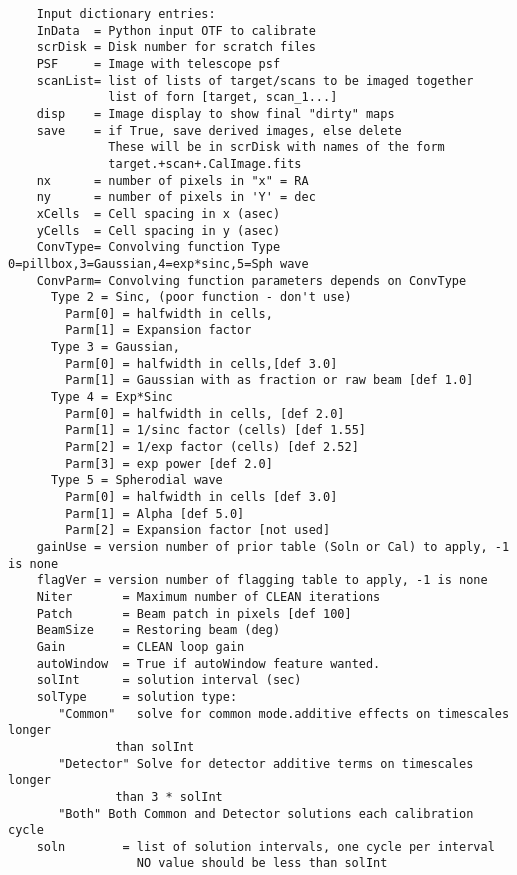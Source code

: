 \documentclass[11pt]{report}
\begin{document}
\begin{verbatim}
    Input dictionary entries:
    InData  = Python input OTF to calibrate
    scrDisk = Disk number for scratch files
    PSF     = Image with telescope psf
    scanList= list of lists of target/scans to be imaged together
              list of forn [target, scan_1...]
    disp    = Image display to show final "dirty" maps
    save    = if True, save derived images, else delete
              These will be in scrDisk with names of the form
              target.+scan+.CalImage.fits
    nx      = number of pixels in "x" = RA
    ny      = number of pixels in 'Y' = dec
    xCells  = Cell spacing in x (asec)
    yCells  = Cell spacing in y (asec)
    ConvType= Convolving function Type 0=pillbox,3=Gaussian,4=exp*sinc,5=Sph wave
    ConvParm= Convolving function parameters depends on ConvType
      Type 2 = Sinc, (poor function - don't use)
        Parm[0] = halfwidth in cells,
        Parm[1] = Expansion factor
      Type 3 = Gaussian,
        Parm[0] = halfwidth in cells,[def 3.0]
        Parm[1] = Gaussian with as fraction or raw beam [def 1.0]
      Type 4 = Exp*Sinc
        Parm[0] = halfwidth in cells, [def 2.0]
        Parm[1] = 1/sinc factor (cells) [def 1.55]
        Parm[2] = 1/exp factor (cells) [def 2.52]
        Parm[3] = exp power [def 2.0]
      Type 5 = Spherodial wave 
        Parm[0] = halfwidth in cells [def 3.0]
        Parm[1] = Alpha [def 5.0]
        Parm[2] = Expansion factor [not used]
    gainUse = version number of prior table (Soln or Cal) to apply, -1 is none
    flagVer = version number of flagging table to apply, -1 is none
    Niter       = Maximum number of CLEAN iterations
    Patch       = Beam patch in pixels [def 100]
    BeamSize    = Restoring beam (deg)
    Gain        = CLEAN loop gain
    autoWindow  = True if autoWindow feature wanted.
    solInt      = solution interval (sec)
    solType     = solution type:
       "Common"   solve for common mode.additive effects on timescales longer
               than solInt
       "Detector" Solve for detector additive terms on timescales longer
               than 3 * solInt
       "Both" Both Common and Detector solutions each calibration cycle
    soln        = list of solution intervals, one cycle per interval
                  NO value should be less than solInt
    
\end{verbatim}
\end{document}
